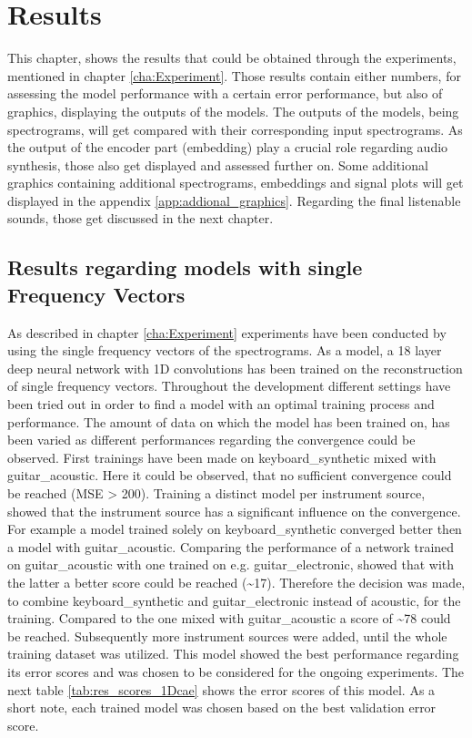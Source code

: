 \chapter[Results]{Results}
\label{cha:Results}

This chapter, shows the results that could be obtained through the experiments, mentioned in chapter \ref{cha:Experiment}. Those results contain either numbers, for assessing the model performance with a certain error performance, but also of graphics, displaying the outputs of the models. The outputs of the models, being spectrograms, will get compared with their corresponding input spectrograms. As the output of the encoder part (embedding) play a crucial role regarding audio synthesis, those also get displayed and assessed further on. Some additional graphics containing additional spectrograms, embeddings and signal plots will get displayed in the appendix \ref{app:addional_graphics}. Regarding the final listenable sounds, those get discussed in the next chapter.

\section{Results regarding models with single Frequency Vectors}
As described in chapter \ref{cha:Experiment} experiments have been conducted by using the single frequency vectors of the spectrograms. As a model, a 18 layer deep neural network with 1D convolutions has been trained on the reconstruction of single frequency vectors. 
Throughout the development different settings have been tried out in order to find a model with an optimal training process and performance. The amount of data on which the model has been trained on, has been varied as different performances regarding the convergence could be observed. First trainings have been made on keyboard\_synthetic mixed with guitar\_acoustic. Here it could be observed, that no sufficient convergence could be reached (MSE > 200). Training a distinct model per instrument source, showed that the instrument source has a significant influence on the convergence. For example a model trained solely on keyboard\_synthetic converged better then a model with guitar\_acoustic. Comparing the performance of a network trained on guitar\_acoustic with one trained on e.g. guitar\_electronic, showed that with the latter a better score could be reached (\textasciitilde 17). Therefore the decision was made, to combine keyboard\_synthetic and guitar\_electronic instead of acoustic, for the training. Compared to the one mixed with guitar\_acoustic a score of \textasciitilde 78 could be reached. Subsequently more instrument sources were added, until the whole training dataset was utilized. This model showed the best performance regarding its error scores and was chosen to be considered for the ongoing experiments. The next table \ref{tab:res_scores_1Dcae} shows the error scores of this model. As a short note, each trained model was chosen based on the best validation error score. 

